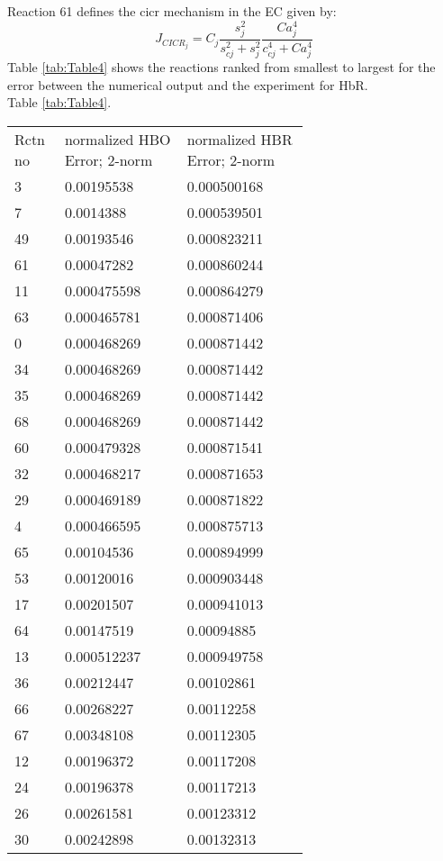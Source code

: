 \documentclass[]{article}
\begin{document}
Reaction 61 defines the \Gls{cicr} mechanism in the EC given by:
\begin{equation} \label{eq:JCICRJ}
J_{CICR_{j}} = C_{j}\frac{s_j^{2}}{s_{cj}^{2}+s_j^{2}}    \frac{Ca_j^{4}}{c_{cj}^{4}+Ca_j^{4}}
\end{equation}
Table \ref{tab:Table4} shows the reactions ranked from smallest to largest for the error between the numerical output and the experiment for HbR.\\
Table \ref{tab:Table4}.
\begin{longtable}[h!] { p{0.05\linewidth}  p{0.3\linewidth}   p{0.3\linewidth} }
	\hline
Rctn no	&	normalized HBO Error; 2-norm	& normalized HBR Error; 2-norm\\
3	&	0.00195538	&0.000500168\\
7	&0.0014388	&0.000539501\\
49	&0.00193546&	0.000823211\\
61	&0.00047282&	0.000860244\\
11&	0.000475598	&0.000864279\\
63	&0.000465781	&0.000871406\\
0	&	0.000468269	&0.000871442\\
34&0.000468269	&0.000871442\\
35	&	0.000468269	&0.000871442\\
68	& 0.000468269	&0.000871442\\
60&	0.000479328&	0.000871541\\
32&	0.000468217	&0.000871653\\
29	&0.000469189&	0.000871822\\
4	&0.000466595	&0.000875713\\
65	&	0.00104536	&0.000894999\\
53	&	0.00120016	&0.000903448\\
17	&	0.00201507	&0.000941013\\
64	&	0.00147519&	0.00094885\\
13	&0.000512237	&0.000949758\\
36	&	0.00212447	&0.00102861\\
66	&	0.00268227&	0.00112258\\
67	&0.00348108&	0.00112305\\
12	&	0.00196372&	0.00117208\\
24&	0.00196378&	0.00117213\\
26	&	0.00261581	&0.00123312\\
30	&0.00242898	&0.00132313\\

\end{longtable}
\end{document}
